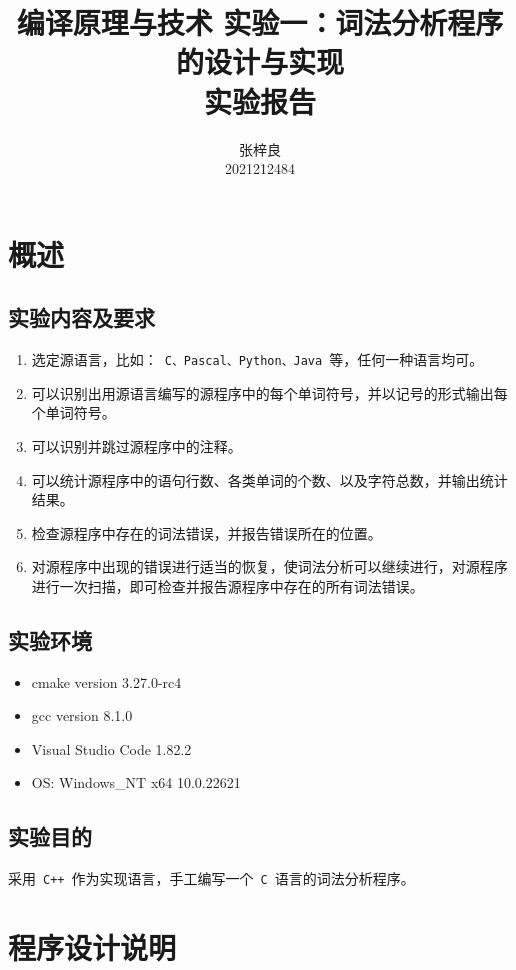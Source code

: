 \documentclass[lang=cn,11pt,a4paper]{paper}
\title{编译原理与技术 实验一：词法分析程序的设计与实现 \\ 实验报告}
\author{张梓良 \\ 2021212484}
\institute{北京邮电大学 \\ 计算机科学与技术}
\date{\zhtoday}
\begin{document}
\maketitle

\section{概述}

\subsection{实验内容及要求}

\begin{enumerate}
  \item 选定源语言，比如：\ \lstinline{C、Pascal、Python、Java}\ 等，任何一种语言均可。
  \item 可以识别出用源语言编写的源程序中的每个单词符号，并以记号的形式输出每个单词符号。
  \item 可以识别并跳过源程序中的注释。
  \item 可以统计源程序中的语句行数、各类单词的个数、以及字符总数，并输出统计结果。
  \item 检查源程序中存在的词法错误，并报告错误所在的位置。
  \item 对源程序中出现的错误进行适当的恢复，使词法分析可以继续进行，对源程序进行一次扫描，即可检查并报告源程序中存在的所有词法错误。
\end{enumerate}

\subsection{实验环境}

\begin{itemize}
    \item cmake version 3.27.0-rc4
    \item gcc version 8.1.0
    \item Visual Studio Code 1.82.2
    \item OS: Windows\_NT x64 10.0.22621
\end{itemize}

\subsection{实验目的}

采用\ \lstinline{C++}\ 作为实现语言，手工编写一个\ \lstinline{C}\ 语言的词法分析程序。

\section{程序设计说明}
\end{document}
